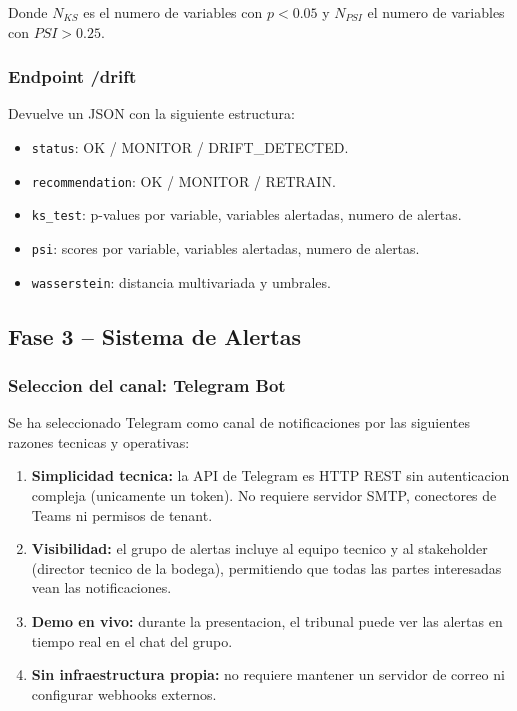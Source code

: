 Donde $N_{KS}$ es el numero de variables con $p < 0.05$ y $N_{PSI}$ el numero de variables con $PSI > 0.25$.

\subsubsection{Endpoint /drift}

Devuelve un JSON con la siguiente estructura:
\begin{itemize}
    \item \texttt{status}: OK / MONITOR / DRIFT\_DETECTED.
    \item \texttt{recommendation}: OK / MONITOR / RETRAIN.
    \item \texttt{ks\_test}: p-values por variable, variables alertadas, numero de alertas.
    \item \texttt{psi}: scores por variable, variables alertadas, numero de alertas.
    \item \texttt{wasserstein}: distancia multivariada y umbrales.
\end{itemize}

\subsection{Fase 3 -- Sistema de Alertas}

\subsubsection{Seleccion del canal: Telegram Bot}

Se ha seleccionado Telegram como canal de notificaciones por las siguientes razones tecnicas y operativas:

\begin{enumerate}
    \item \textbf{Simplicidad tecnica:} la API de Telegram es HTTP REST sin autenticacion compleja (unicamente un token). No requiere servidor SMTP, conectores de Teams ni permisos de tenant.
    \item \textbf{Visibilidad:} el grupo de alertas incluye al equipo tecnico y al stakeholder (director tecnico de la bodega), permitiendo que todas las partes interesadas vean las notificaciones.
    \item \textbf{Demo en vivo:} durante la presentacion, el tribunal puede ver las alertas en tiempo real en el chat del grupo.
    \item \textbf{Sin infraestructura propia:} no requiere mantener un servidor de correo ni configurar webhooks externos.
\end{enumerate}

